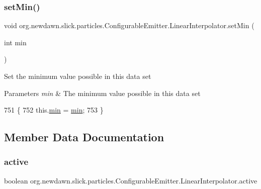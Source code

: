 \subsubsection{\texorpdfstring{set\+Min()}{setMin()}}
{\footnotesize\ttfamily void org.\+newdawn.\+slick.\+particles.\+Configurable\+Emitter.\+Linear\+Interpolator.\+set\+Min (\begin{DoxyParamCaption}\item[{int}]{min }\end{DoxyParamCaption})\hspace{0.3cm}{\ttfamily [inline]}}

Set the minimum value possible in this data set


\begin{DoxyParams}{Parameters}
{\em min} & The minimum value possible in this data set \\
\hline
\end{DoxyParams}

\begin{DoxyCode}
751                                     \{
752             this.\mbox{\hyperlink{classorg_1_1newdawn_1_1slick_1_1particles_1_1_configurable_emitter_1_1_linear_interpolator_aa1aa9af8efa3ec59587abfb5a4831e42}{min}} = \mbox{\hyperlink{classorg_1_1newdawn_1_1slick_1_1particles_1_1_configurable_emitter_1_1_linear_interpolator_aa1aa9af8efa3ec59587abfb5a4831e42}{min}};
753         \}
\end{DoxyCode}


\subsection{Member Data Documentation}
\mbox{\label{classorg_1_1newdawn_1_1slick_1_1particles_1_1_configurable_emitter_1_1_linear_interpolator_a0f28ab5311b6eaa1a406818811e39b54}} 
\subsubsection{\texorpdfstring{active}{active}}
{\footnotesize\ttfamily boolean org.\+newdawn.\+slick.\+particles.\+Configurable\+Emitter.\+Linear\+Interpolator.\+active\hspace{0.3cm}{\ttfamily [private]}}

